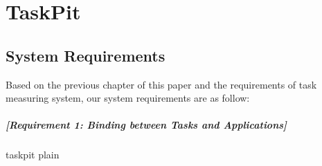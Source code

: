 \documentclass {article}
\begin{document}
\section{TaskPit}

\subsection{System Requirements}
	Based on the previous chapter of this paper and the requirements of task measuring system, our system requirements are as follow:
	
\subparagraph{[Requirement 1: Binding between Tasks and Applications]}
	
	
 {taskpit}
 {plain}

	
\end{document}
